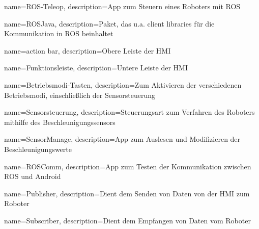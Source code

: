 {
  name=ROS-Teleop,
  description={App zum Steuern eines Roboters mit ROS}
}

{
  name=ROSJava,
  description={Paket, das u.a. client libraries für die Kommunikation in ROS beinhaltet}
}

{
  name=action bar,
  description={Obere Leiste der HMI}
}

{
  name=Funktionsleiste,
  description={Untere Leiste der HMI}
}

{
  name=Betriebsmodi-Tasten,
  description={Zum Aktivieren der verschiedenen Betriebsmodi, einschließlich der Sensorsteuerung}
}

{
  name=Sensorsteuerung,
  description={Steuerungsart zum Verfahren des Roboters mithilfe des Beschleunigungssensors}
}

{
  name=SensorManage,
  description={App zum Auslesen und Modifizieren der Beschleunigungswerte}
}

{
  name=ROSComm,
  description={App zum Testen der Kommunikation zwischen ROS und Android}
}

{
  name=Publisher,
  description={Dient dem Senden von Daten von der HMI zum Roboter}
}

{
  name=Subscriber,
  description={Dient dem Empfangen von Daten vom Roboter}
}


